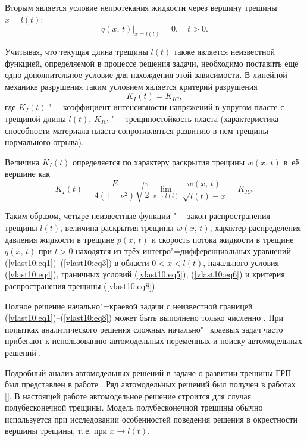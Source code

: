 Вторым является условие непротекания жидкости через вершину трещины $x=l (t)$:
\begin{equation}
q (x,\, t)\bigr|_{x=l(t)}=0,\quad  t>0.\label{vlast10:eq6}
\end{equation}

Учитывая, что текущая длина трещины $l(t)$ также является неизвестной функцией, определяемой
в процессе решения задачи, необходимо поставить ещё одно дополнительное условие для нахождения этой зависимости.
В линейной механике разрушения таким условием является критерий разрушения \cite{vlast10:4}
\begin{equation}
K_{I}(t)=K_{IC},\label{vlast10:eq7}
\end{equation}
где $K_{I}(t)$ "--- коэффициент интенсивности напряжений в упругом пласте с трещиной длины
$l(t)$, $K_{IC}$ "--- трещиностойкость пласта (характеристика способности материала пласта
сопротивляться развитию в нем трещины нормального отрыва).

Величина $K_{I}(t)$ определяется по характеру раскрытия трещины $w (x,\, t)$ в~её вершине
как \cite{vlast10:4}
\begin{equation}
K_{I}(t)=\frac{E}{4 (1-\nu^{2})}\sqrt{\frac{\pi}{2}}\lim_{x \rightarrow l (t)}
\frac{w (x,\, t)}{\sqrt{l (t)-x}}=K_{IC}.\label{vlast10:eq8}
\end{equation}

Таким образом, четыре неизвестные функции "--- закон распространения трещины $l (t )$,
величина раскрытия трещины $w (x,\, t)$, характер распределения давления жидкости
в трещине $p (x,\, t)$ и скорость потока жидкости в трещине $q (x,\, t)$ при $t>0$
находятся из трёх интегро"=дифференциальных уравнений (\ref{vlast10:eq1})--(\ref{vlast10:eq3}) в области $0<x<l (t )$,
начального условия (\ref{vlast10:eq4}), граничных условий (\ref{vlast10:eq5}), (\ref{vlast10:eq6})
и критерия распространения трещины (\ref{vlast10:eq8}).

\smallskip

 Полное решение начально"=краевой задачи с неизвестной границей (\ref{vlast10:eq1})--(\ref{vlast10:eq8})
может быть выполнено только численно \cite{vlast10:5}. При попытках аналитического решения сложных
начально"=краевых задач часто прибегают к использованию автомодельных переменных
и поиску автомодельных решений \cite{vlast10:6}.

Подробный анализ автомодельных решений в задаче о развитии трещины ГРП был представлен в работе \cite{vlast10:7}.
Ряд автомодельных решений был получен в работах [].
В настоящей работе автомодельное решение строится для случая полубесконечной трещины.
Модель полубесконечной трещины обычно используется при исследовании особенностей поведения
решения в окрестности вершины трещины, т.\,е. при $x \rightarrow l (t)$.

